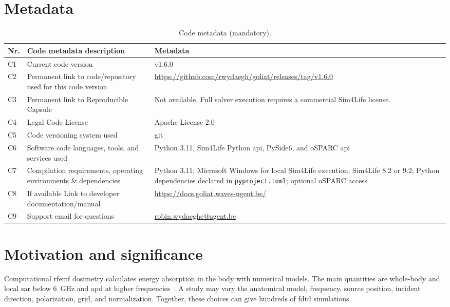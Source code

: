 \documentclass[final,5p,times,twocolumn]{elsarticle}
\begin{document}
\ifdefined\SoftwareXPublishedPreview
\else
\clearpage
\section*{Metadata}
\fi

\begin{table}[!ht]
\centering
\small
\begin{tabularx}{\textwidth}{|l|>{\raggedright\arraybackslash}p{}|>{\raggedright\arraybackslash}X|}
\hline
\textbf{Nr.} & \textbf{Code metadata description} & \textbf{Metadata} \\
\hline
C1 & Current code version & v1.6.0 \\
\hline
C2 & Permanent link to code/repository used for this code version & \url{https://github.com/rwydaegh/goliat/releases/tag/v1.6.0} \\
\hline
C3 & Permanent link to Reproducible Capsule & Not available. Full solver execution requires a commercial Sim4Life license. \\
\hline
C4 & Legal Code License & Apache License 2.0 \\
\hline
C5 & Code versioning system used & git \\
\hline
C6 & Software code languages, tools, and services used & Python 3.11, Sim4Life Python \gls{api}, PySide6, and oSPARC \gls{api} \\
\hline
C7 & Compilation requirements, operating environments \& dependencies & Python 3.11; Microsoft Windows for local Sim4Life execution; Sim4Life 8.2 or 9.2; Python dependencies declared in \texttt{pyproject.toml}; optional oSPARC access \\
\hline
C8 & If available Link to developer documentation/manual & \url{https://docs.goliat.waves-ugent.be/} \\
\hline
C9 & Support email for questions & \url{robin.wydaeghe@ugent.be} \\
\hline
\end{tabularx}
\caption{Code metadata (mandatory).}
\label{codeMetadata}
\end{table}

\glsresetall

\section{Motivation and significance}

Computational \gls{rfemf} dosimetry calculates energy absorption in the body with numerical models. The main quantities are whole-body and local \gls{sar} below 6~GHz and \gls{apd} at higher frequencies~\cite{Hand2008,Hirata2021}. A study may vary the anatomical model, frequency, source position, incident direction, polarization, grid, and normalization. Together, these choices can give hundreds of \gls{fdtd} simulations.
\end{document}
